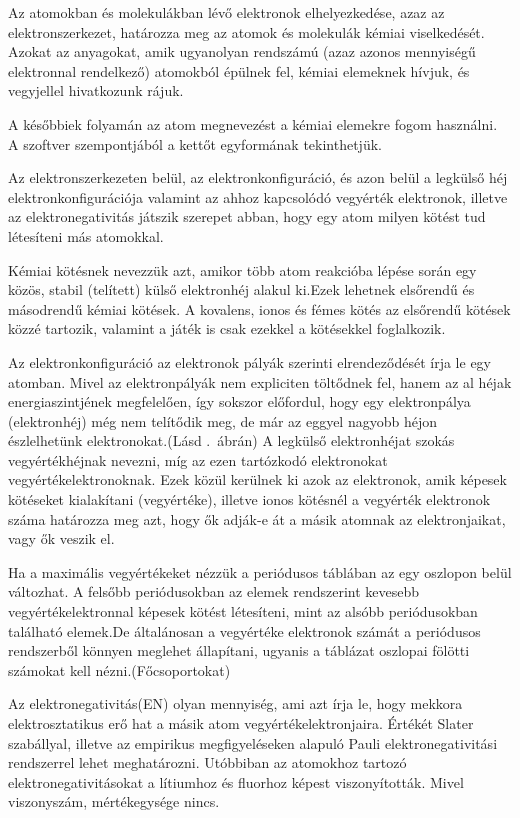 \documentclass[colorlinks]{thesis-ekf}
\theoremstyle{definition}
\theoremstyle{remark}
\begin{document}
Az atomokban és molekulákban lévő elektronok elhelyezkedése, azaz az elektronszerkezet, határozza meg az atomok és molekulák kémiai viselkedését.\cite{wiki_e_szerk}
Azokat az anyagokat, amik ugyanolyan rendszámú (azaz azonos mennyiségű elektronnal rendelkező) atomokból épülnek fel, kémiai elemeknek hívjuk, és vegyjellel hivatkozunk rájuk.\cite{periodusos_ppt} 

A későbbiek folyamán az atom megnevezést a kémiai elemekre fogom használni. A szoftver szempontjából a kettőt egyformának tekinthetjük.

Az elektronszerkezeten belül, az elektronkonfiguráció, és azon belül a legkülső héj elektronkonfigurációja valamint az ahhoz kapcsolódó vegyérték elektronok, illetve az elektronegativitás játszik szerepet abban, hogy egy atom milyen kötést tud létesíteni más atomokkal. 

Kémiai kötésnek nevezzük azt, amikor több atom reakcióba lépése során egy közös, stabil (telített) külső elektronhéj alakul ki.Ezek lehetnek elsőrendű és másodrendű kémiai kötések. A kovalens, ionos és fémes kötés az elsőrendű kötések közzé tartozik\cite{miskolc_kemia}, valamint a játék is csak ezekkel a kötésekkel foglalkozik.

Az elektronkonfiguráció az elektronok pályák szerinti elrendeződését írja le egy atomban.\cite{periodusos_ppt} Mivel az elektronpályák nem expliciten töltődnek fel, hanem az al héjak energiaszintjének megfelelően, így sokszor előfordul, hogy egy elektronpálya (elektronhéj) még nem telítődik meg, de már az eggyel nagyobb héjon észlelhetünk elektronokat.(Lásd .~ábrán)
A legkülső elektronhéjat szokás vegyértékhéjnak nevezni, míg az ezen tartózkodó elektronokat vegyértékelektronoknak.\cite{vegyérték_sulinet} Ezek közül kerülnek ki azok az elektronok, amik képesek kötéseket kialakítani (vegyértéke), illetve ionos kötésnél a vegyérték elektronok száma határozza meg azt, hogy ők adják-e át a másik atomnak az elektronjaikat, vagy ők veszik el.\cite{ionos_vidi}

Ha a maximális vegyértékeket nézzük a periódusos táblában az egy oszlopon belül változhat. A felsőbb periódusokban az elemek rendszerint kevesebb vegyértékelektronnal képesek kötést létesíteni, mint az alsóbb periódusokban található elemek.\cite{periodusos_ppt}De általánosan a vegyértéke elektronok számát a periódusos rendszerből könnyen meglehet állapítani, ugyanis a táblázat oszlopai fölötti számokat kell nézni.(Főcsoportokat) \cite{vegyérték_sulinet}

Az elektronegativitás(EN) olyan mennyiség, ami azt írja le, hogy mekkora elektrosztatikus erő hat a másik atom vegyértékelektronjaira.\cite{angol_en} Értékét Slater szabállyal, illetve az empirikus megfigyeléseken alapuló Pauli elektronegativitási rendszerrel lehet meghatározni. Utóbbiban az atomokhoz tartozó elektronegativitásokat a lítiumhoz és fluorhoz képest viszonyították. Mivel viszonyszám, mértékegysége nincs.\cite{miskolc_kemia}\cite{eke_kemia_ppt}
\end{document}
